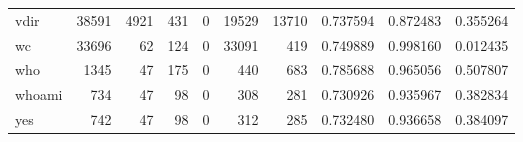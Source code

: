 \begin{tabular}{lrrrrrrrrr}
vdir      &                                              38591 &                                               4921 &                                                431 &                                                  0 &                                              19529 &                                              13710 &                                           0.737594 &                               0.872483 &                             0.355264 \\
wc        &                                              33696 &                                                 62 &                                                124 &                                                  0 &                                              33091 &                                                419 &                                           0.749889 &                               0.998160 &                             0.012435 \\
who       &                                               1345 &                                                 47 &                                                175 &                                                  0 &                                                440 &                                                683 &                                           0.785688 &                               0.965056 &                             0.507807 \\
whoami    &                                                734 &                                                 47 &                                                 98 &                                                  0 &                                                308 &                                                281 &                                           0.730926 &                               0.935967 &                             0.382834 \\
yes       &                                                742 &                                                 47 &                                                 98 &                                                  0 &                                                312 &                                                285 &                                           0.732480 &                               0.936658 &                             0.384097 \\
\bottomrule
\end{tabular}
